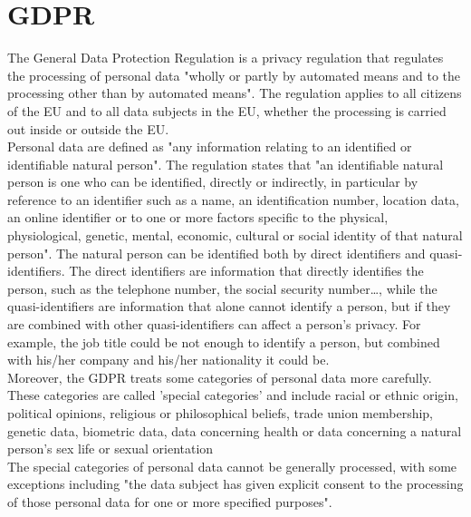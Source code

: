 \section{GDPR}
The General Data Protection Regulation is a privacy regulation that regulates the processing of personal data "wholly or partly by automated means and to the processing other than by automated means". The regulation applies to all citizens of the EU and to all data subjects in the EU, whether the processing is carried out inside or outside the EU. \\
Personal data are defined as "any information relating to an identified or identifiable natural person". The regulation states that "an identifiable natural person is one who can be identified, directly or indirectly, in particular by reference to an identifier such as a name, an identification number, location data, an online identifier or to one or more factors specific to the physical, physiological, genetic, mental, economic, cultural or social identity of that natural person". The natural person can be identified both by direct identifiers and quasi-identifiers. The direct identifiers are information that directly identifies the person, such as the telephone number, the social security number\dots, while the quasi-identifiers are information that alone cannot identify a person, but if they are combined with other quasi-identifiers can affect a person's privacy. For example, the job title could be not enough to identify a person, but combined with his/her company and his/her nationality it could be. \\
Moreover, the GDPR treats some categories of personal data more carefully. These categories are called 'special categories' and include racial or ethnic origin, political opinions, religious or philosophical beliefs, trade union membership, genetic data, biometric data, data concerning health or data concerning a natural person's sex life or sexual orientation \\
The special categories of personal data cannot be generally processed, with some exceptions including "the data subject has given explicit consent to the processing of those personal data for one or more specified purposes".\\


